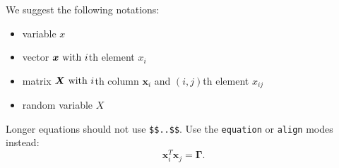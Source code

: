 \documentclass{article}
\renewcommand{\vec}[1]{\mathbold{#1}}
\newcommand{\mat}[1]{\mathbold{#1}}
\newcommand{\vx}{\vec{x}}
\newcommand{\vGamma}{\mat{\Gamma}}
\newcommand{\vX}{\mat{X}}
\begin{document}
We suggest the following notations:
\begin{itemize}
\item variable \(x\) 
\item vector \(\vx$ with \(i\)th element \(x_i\)
\item matrix \(\vX$ with \(i\)th column \(\vx_i\) and \((i,j)\)th element \(x_{ij}\)
\item random variable \(X\)
\end{itemize}

Longer equations should not use \texttt{\$\$..\$\$}.
Use the \texttt{equation} or \texttt{align} modes instead:
\begin{equation*}
\vx_i^T \vx_j = \vGamma.
\end{equation*}
\end{document}
